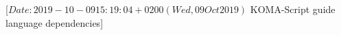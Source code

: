 %
%
%
%
%
%
%
%
% 
%
%
%
%
%
                 [$Date: 2019-10-09 15:19:04 +0200 (Wed, 09 Oct 2019) $
                  KOMA-Script guide language dependencies]
%
%
